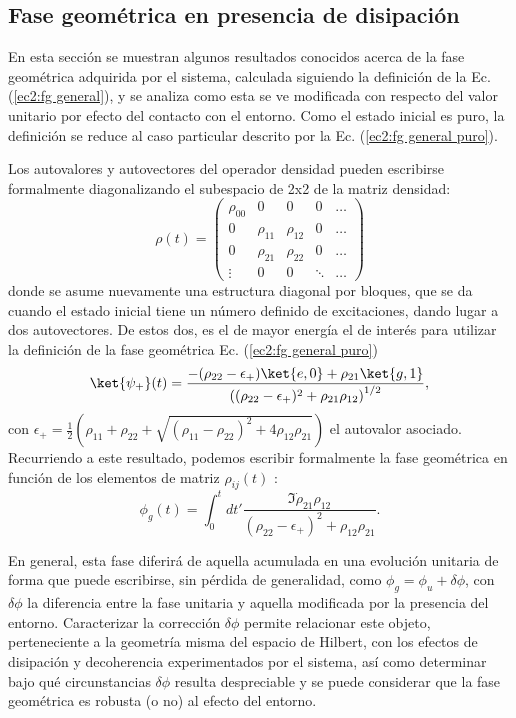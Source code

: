 \subsection{Fase geométrica en presencia de disipación}
\label{sec3:fg disipacion}
En esta sección se muestran algunos resultados conocidos acerca de la fase geométrica adquirida por el sistema, calculada siguiendo la definición de la Ec. (\ref{ec2:fg general}), y se analiza como esta se ve modificada con respecto del valor unitario por efecto del contacto con el entorno. Como el estado inicial es puro, la definición se reduce al caso particular descrito por la Ec. (\ref{ec2:fg general puro}).

Los autovalores y autovectores del operador densidad pueden escribirse formalmente  diagonalizando el subespacio de 2x2 de la matriz densidad:
\begin{equation}
    \rho(t)=\begin{pmatrix}
        \rho_{00} & 0 & 0 & 0 &\dots \\
        0 & \rho_{11} & \rho_{12} & 0 & \dots \\
        0 & \rho_{21} & \rho_{22} & 0 & \dots \\ 
        \vdots & 0 & 0 & \ddots & \dots 
    \end{pmatrix}
\end{equation}
donde se asume nuevamente una estructura diagonal por bloques, que se da cuando el estado inicial tiene un número definido de excitaciones, dando lugar a dos autovectores. De estos dos, es el de mayor energía el de interés para utilizar la definición de la fase geométrica Ec. (\ref{ec2:fg general puro})
\begin{equation}
    \ket{\psi_+}(t)=\frac{-(\rho_{22}-\epsilon_+)\ket{e,0}+\rho_{21}\ket{g,1}}{\left((\rho_{22}-\epsilon_+)^2+\rho_{21}\rho_{12} \right)^{1/2}},
\end{equation}
con $\epsilon_+=\frac{1}{2}(\rho_{11}+\rho_{22}+\sqrt{(\rho_{11}-\rho_{22})^2+4\rho_{12}\rho_{21}})$ el autovalor asociado. Recurriendo a este resultado, podemos escribir formalmente la fase geométrica en función de los elementos de matriz $\rho_{ij}(t)$ \cite{Viotti2022}:
\begin{equation}
    \phi_g(t)=\int_0^t dt' \frac{\Im \dot\rho_{21}\rho_{12}}{(\rho_{22}-\epsilon_+)^2+\rho_{12}\rho_{21}}.
\end{equation}

En general, esta fase diferirá de aquella acumulada en una evolución unitaria de forma que puede
escribirse, sin pérdida de generalidad, como $\phi_g=\phi_u+\delta\phi$, con $\delta\phi$ la diferencia entre la fase unitaria y
aquella modificada por la presencia del entorno. Caracterizar la corrección $\delta\phi$ permite relacionar este
objeto, perteneciente a la geometría misma del espacio de Hilbert, con los efectos de disipación y
decoherencia experimentados por el sistema, así como determinar bajo qué circunstancias $\delta\phi$ resulta
despreciable y se puede considerar que la fase geométrica es robusta (o no) al efecto del entorno.

